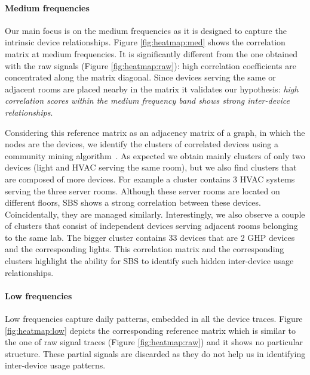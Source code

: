 \paragraph{Medium frequencies}
Our main focus is on the medium frequencies as it is designed to capture the intrinsic device relationships.
Figure \ref{fig:heatmap:med} shows the correlation matrix at medium frequencies.
It is significantly different from the one obtained with the raw signals (Figure \ref{fig:heatmap:raw}): high correlation coefficients are concentrated along the matrix diagonal. 
Since devices serving the same or adjacent rooms are placed nearby in the matrix it validates our hypothesis: \emph{high correlation scores within the medium frequency band shows strong inter-device relationships}.

Considering this reference matrix as an adjacency matrix of a graph, in which the nodes are the devices, we identify the clusters of 
correlated devices using a community mining algorithm~\cite{blondel:unfolding}.
As expected we obtain mainly clusters of only two devices (light and HVAC serving the same room), but we also find clusters that are composed of more devices.
For example a cluster contains 3 HVAC systems serving the three server rooms. Although these server rooms are located on
 different floors, SBS shows a strong correlation between these devices.  Coincidentally, they are managed similarly.
Interestingly, we also observe a couple of clusters that consist of independent devices serving adjacent rooms belonging to the same lab.
The bigger cluster contains 33 devices that are 2 GHP devices and the corresponding lights.
This correlation matrix and the corresponding clusters 
highlight the ability for SBS to identify such hidden inter-device usage relationships.
 
\paragraph{Low frequencies}
Low frequencies capture daily patterns, embedded in all the device traces.  
Figure \ref{fig:heatmap:low} depicts the corresponding reference matrix which is similar to the one of raw signal traces (Figure \ref{fig:heatmap:raw}) 
and it shows no particular structure.%
These partial signals are discarded as they do not help us in identifying inter-device usage patterns.
 
